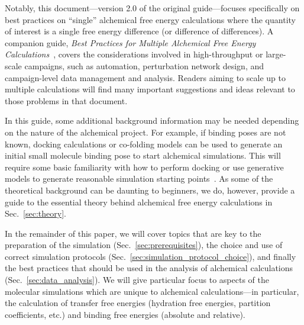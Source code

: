 \documentclass[9pt,bestpractices]{livecoms}
\begin{document}
Notably, this document---version 2.0 of the original guide---focuses specifically on best practices on ``single'' alchemical free energy calculations where the quantity of interest is a single free energy difference (or difference of differences). A companion guide, \textit{Best Practices for Multiple Alchemical Free Energy Calculations}~\cite{mey_largescale_inprep}, covers the considerations involved in high-throughput or large-scale campaigns, such as automation, perturbation network design, and campaign-level data management and analysis. Readers aiming to scale up to multiple calculations will find many important suggestions and ideas relevant to those problems in that document.

In this guide, some additional background information may be needed depending on the nature of the alchemical project. For example, if binding poses are not known, docking calculations or co-folding models can be used to generate an initial small molecule binding pose to start alchemical simulations\cite{scheen2025leveraging, thaler2026boltz, coskun_2023, beuming_2022}. This will require some basic familiarity with how to perform docking or use generative models to generate reasonable simulation starting points~\cite{grinter2014challenges}. 
As some of the theoretical background can be daunting to beginners, we do, however, provide a guide to the essential theory behind alchemical free energy calculations in Sec.~\ref{sec:theory}.

In the remainder of this paper, we will cover topics that are key to the preparation of the simulation (Sec.~\ref{sec:prerequisites}), the choice and use of correct simulation protocols (Sec.~\ref{sec:simulation_protocol_choice}), and finally the best practices that should be used in the analysis of alchemical calculations (Sec.~\ref{sec:data_analysis}). 
We will give particular focus to aspects of the molecular simulations which are unique to alchemical calculations---in particular, the calculation of transfer free energies (hydration free energies, partition coefficients, etc.) and binding free energies (absolute and relative). 
\end{document}
